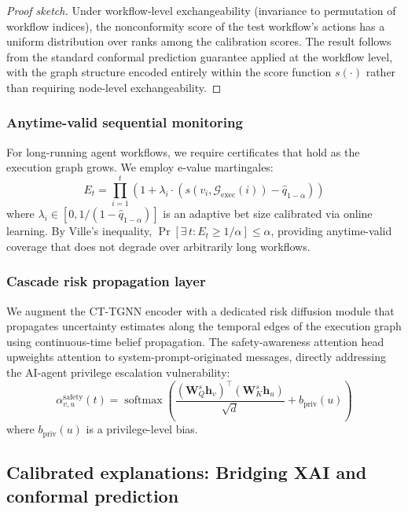 \documentclass[preprint,review,12pt]{elsarticle}
\newcommand{\calG}{\mathcal{G}}
\DeclareMathOperator{\softmax}{softmax}
\begin{document}
\begin{proof}[Proof sketch]
Under workflow-level exchangeability (invariance to permutation of workflow indices), the nonconformity score of the test workflow's actions has a uniform distribution over ranks among the calibration scores. The result follows from the standard conformal prediction guarantee applied at the workflow level, with the graph structure encoded entirely within the score function $s(\cdot)$ rather than requiring node-level exchangeability.
\end{proof}

\subsubsection{Anytime-valid sequential monitoring}
For long-running agent workflows, we require certificates that hold as the execution graph grows. We employ e-value martingales:
\begin{equation}\label{eq:e_value}
    E_t = \prod_{i=1}^{t} \left(1 + \lambda_i \cdot \left(s(v_i, \calG_{\text{exec}}(i)) - \hat{q}_{1-\alpha}\right)\right)
\end{equation}
where $\lambda_i \in [0, 1/(1{-}\hat{q}_{1-\alpha})]$ is an adaptive bet size calibrated via online learning. By Ville's inequality, $\Pr[\exists\, t : E_t \geq 1/\alpha] \leq \alpha$, providing anytime-valid coverage that does not degrade over arbitrarily long workflows.

\subsubsection{Cascade risk propagation layer}
We augment the CT-TGNN encoder with a dedicated risk diffusion module that propagates uncertainty estimates along the temporal edges of the execution graph using continuous-time belief propagation. The safety-awareness attention head upweights attention to system-prompt-originated messages, directly addressing the AI-agent privilege escalation vulnerability:
\begin{equation}
    \alpha^{\text{safety}}_{v,u}(t) = \softmax\!\left(\frac{(\mathbf{W}_Q^s \mathbf{h}_v)^\top (\mathbf{W}_K^s \mathbf{h}_u)}{\sqrt{d}} + b_{\text{priv}}(u)\right)
\end{equation}
where $b_{\text{priv}}(u)$ is a privilege-level bias.

\subsection{Calibrated explanations: Bridging XAI and conformal prediction}
\end{document}
